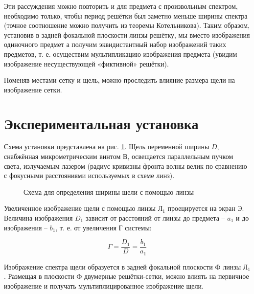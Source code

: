 \documentclass[a5paper,10pt, twoside]{article} %
\begin{document}
		Эти рассуждения можно повторить и для предмета с произвольным спектром, необходимо только, чтобы период решётки был заметно меньше ширины спектра (точное соотношение можно получить из теоремы Котельникова). Таким образом, установив в задней фокальной плоскости линзы решётку, мы вместо изображения одиночного предмет а получим эквидистантный набор изображений таких предметов, т. е. осуществим мультипликацию изображения предмета (увидим изображение	несуществующей «фиктивной» решётки).
		
		Поменяв местами сетку и щель, можно проследить влияние размера щели на изображение сетки.
		
\section{Экспериментальная установка}
	
	Схема установки представлена на рис. \ref{ris:ust}. Щель переменной ширины $D$, снабжённая микрометрическим винтом В, освещается параллельным пучком света, излучаемым
	лазером (радиус кривизны фронта волны велик по сравнению с фокусными расстояниями используемых в схеме линз).
	
	\begin{figure}[h]
		\caption{Схема для определения ширины щели с помощью линзы}
		\label{ris:ust}
	\end{figure}
	
	Увеличенное изображение щели с помощью линзы $Л_1$ проецируется на экран Э. Величина изображения $D_1$ зависит от расстояний от линзы до предмета -- $a_1$ и до изображения -- $b_1$, т. е. от увеличения Г системы:
	
	\begin{equation}
		\Gamma = \frac{D_1}{D} = \frac{b_1}{a_1}
	\end{equation}
	
	Изображение спектра щели образуется в задней фокальной плоскости Ф линзы $Л_1$. Размещая в плоскости Ф двумерные решётки-сетки, можно влиять на первичное изображение и получать мультиплицированное изображение щели.
	
\end{document}
